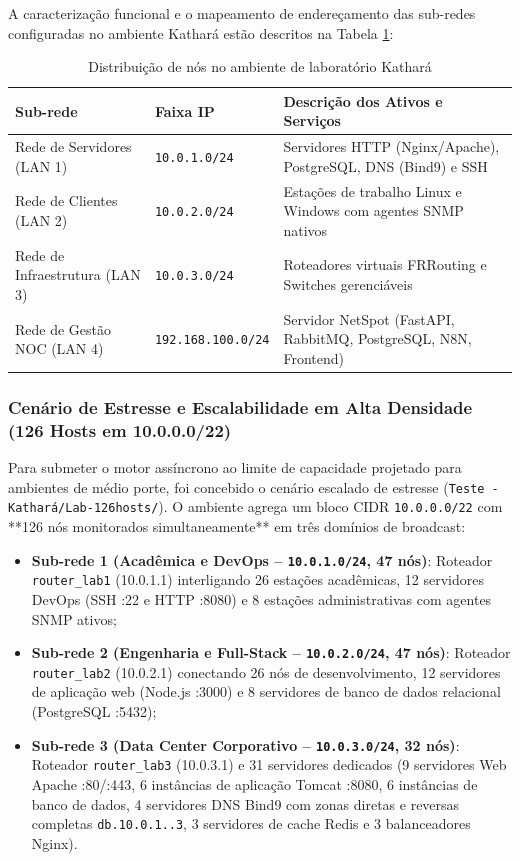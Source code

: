 \documentclass[12pt,a4paper]{article}
\newcommand{\fonte}[1]{\par\vspace{-0.5em}{\small Fonte: #1}\par}
\begin{document}
A caracterização funcional e o mapeamento de endereçamento das sub-redes configuradas no ambiente Kathará estão descritos na Tabela \ref{tab:distribuicao_kathara}:

\begin{table}[H]
\centering
\caption{Distribuição de nós no ambiente de laboratório Kathará}
\label{tab:distribuicao_kathara}
\small
\begin{tabular}{@{}p{4.5cm}p{4.0cm}p{6.5cm}@{}}
\toprule
\textbf{Sub-rede} & \textbf{Faixa IP} & \textbf{Descrição dos Ativos e Serviços} \\
\midrule
Rede de Servidores (LAN 1) & \texttt{10.0.1.0/24} & Servidores HTTP (Nginx/Apache), PostgreSQL, DNS (Bind9) e SSH \\
Rede de Clientes (LAN 2) & \texttt{10.0.2.0/24} & Estações de trabalho Linux e Windows com agentes SNMP nativos \\
Rede de Infraestrutura (LAN 3) & \texttt{10.0.3.0/24} & Roteadores virtuais FRRouting e Switches gerenciáveis \\
Rede de Gestão NOC (LAN 4) & \texttt{192.168.100.0/24} & Servidor NetSpot (FastAPI, RabbitMQ, PostgreSQL, N8N, Frontend) \\
\bottomrule
\end{tabular}
\fonte{Autoria própria (2026).}
\end{table}

\subsubsection{Cenário de Estresse e Escalabilidade em Alta Densidade (126 Hosts em 10.0.0.0/22)}
Para submeter o motor assíncrono ao limite de capacidade projetado para ambientes de médio porte, foi concebido o cenário escalado de estresse (\texttt{Teste - Kathará/Lab-126hosts/}). O ambiente agrega um bloco CIDR \texttt{10.0.0.0/22} com **126 nós monitorados simultaneamente** em três domínios de broadcast:
\begin{itemize}[leftmargin=1.25cm]
\item \textbf{Sub-rede 1 (Acadêmica e DevOps -- \texttt{10.0.1.0/24}, 47 nós)}: Roteador \texttt{router\_lab1} (10.0.1.1) interligando 26 estações acadêmicas, 12 servidores DevOps (SSH :22 e HTTP :8080) e 8 estações administrativas com agentes SNMP ativos;
\item \textbf{Sub-rede 2 (Engenharia e Full-Stack -- \texttt{10.0.2.0/24}, 47 nós)}: Roteador \texttt{router\_lab2} (10.0.2.1) conectando 26 nós de desenvolvimento, 12 servidores de aplicação web (Node.js :3000) e 8 servidores de banco de dados relacional (PostgreSQL :5432);
\item \textbf{Sub-rede 3 (Data Center Corporativo -- \texttt{10.0.3.0/24}, 32 nós)}: Roteador \texttt{router\_lab3} (10.0.3.1) e 31 servidores dedicados (9 servidores Web Apache :80/:443, 6 instâncias de aplicação Tomcat :8080, 6 instâncias de banco de dados, 4 servidores DNS Bind9 com zonas diretas e reversas completas \texttt{db.10.0.1..3}, 3 servidores de cache Redis e 3 balanceadores Nginx).
\end{itemize}
\end{document}
